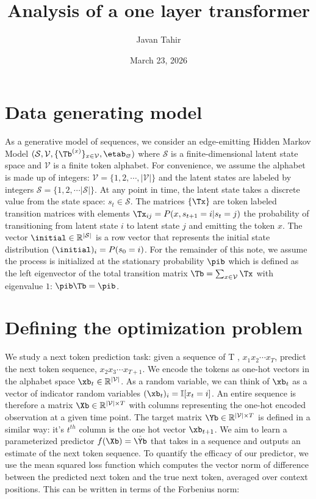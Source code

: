 \documentclass{article}
\title{Analysis of a one layer transformer}
\author{Javan Tahir}
\date{March 23, 2026}
\begin{document}
\maketitle

\section{Data generating model}
As a generative model of sequences, we consider an edge-emitting Hidden Markov Model $(\mathcal{S}, \mathcal{V}, \{ \Tb^{(x)}\}_{{x \in \mathcal{V}}}, \etab_{\varnothing})$ where $\mathcal{S}$ is a finite-dimensional latent state space and $\mathcal{V}$ is a finite token alphabet. For convenience, we assume the alphabet is made up of integers: $\mathcal{V} = \{1, 2, \cdots, |\mathcal{V}|\}$ and the latent states are labeled by integers $\mathcal{S} = \{1,2,\cdots |\mathcal{S}|\}$. At any point in time, the latent state takes a discrete value from the state space: $s_t \in \mathcal{S}$. The matrices $\{\Tx\}$ are token labeled transition matrices with elements $\Tx_{ij} = P(x, s_{t+1} = i | s_t = j)$ the probability of transitioning from latent state $i$ to latent state $j$ and emitting the token $x$. The vector $\initial \in \mathbb{R}^{|\mathcal{S}|}$ is a row vector that represents the initial state distribution $(\initial)_i = P(s_0 = i)$. For the remainder of this note, we assume the process is initialized at the stationary probability $\pib$ which is defined as the left eigenvector of the total transition matrix $\Tb = \sum_{x\in \mathcal{V}} \Tx$ with eigenvalue $1$: $\pib \Tb = \pib$. 

\section{Defining the optimization problem}
We study a next token prediction task: given a sequence of T , $x_1x_2\cdots x_T$, predict the next token sequence, $x_2x_3\cdots x_{T+1}$. We encode the tokens as one-hot vectors in the alphabet space $\xb_t \in \mathbb{R}^{|\mathcal{V}|}$. As a random variable, we can think of $\xb_t$ as a vector of indicator random variables $(\xb_t)_i = \mathbb{I}[x_t = i]$. An entire sequence is therefore a matrix $\Xb \in \mathbb{R}^{|\mathcal{V}| \times T}$ with columns representing the one-hot encoded observation at a given time point. The target matrix $\Yb \in \mathbb{R}^{|\mathcal{V}| \times T}$ is defined in a similar way: it's $t^{th}$ column is the one hot vector $\xb_{t+1}$. We aim to learn a parameterized predictor $f(\Xb) = \hat{\Yb}$ that takes in a sequence and outputs an estimate of the next token sequence. To quantify the efficacy of our predictor, we use the mean squared loss function which computes the vector norm of difference between the predicted next token and the true next token, averaged over context positions. This can be written in terms of the Forbenius norm: 
\end{document}

